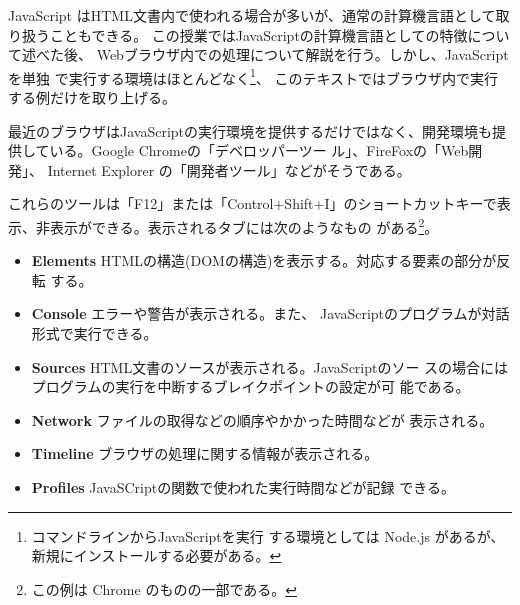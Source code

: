 JavaScript はHTML文書内で使われる場合が多いが、通常の計算機言語として取
り扱うこともできる。
この授業ではJavaScriptの計算機言語としての特徴について述べた後、
Webブラウザ内での処理について解説を行う。しかし、JavaScriptを単独
で実行する環境はほとんどなく\footnote{コマンドラインからJavaScriptを実行
する環境としては Node.js があるが、新規にインストールする必要がある。}、
このテキストではブラウザ内で実行する例だけを取り上げる。

最近のブラウザはJavaScriptの実行環境を提供するだけではなく、開発環境も提
供している。Google Chromeの「デベロッパーツー
ル」、FireFoxの「Web開発」、%
Internet Explorer の「開発者ツール」などがそうである。

これらのツールは「F12」または「Control+Shift+I」のショートカットキーで表
示、非表示ができる。表示されるタブには次のようなもの
がある\footnote{この例は Chrome のものの一部である。}。
\begin{itemize}
 \item {\bfseries Elements }
       HTMLの構造(DOMの構造)を表示する。対応する要素の部分が反転
       する。
 \item {\bfseries Console }エラーや警告が表示される。また、
       JavaScriptのプログラムが対話形式で実行できる。
 \item {\bfseries Sources }HTML文書のソースが表示される。JavaScriptのソー
       スの場合にはプログラムの実行を中断するブレイクポイントの設定が可
       能である。
 \item {\bfseries Network }ファイルの取得などの順序やかかった時間などが
       表示される。
 \item {\bfseries Timeline }ブラウザの処理に関する情報が表示される。
 \item {\bfseries Profiles }JavaSCriptの関数で使われた実行時間などが記録
       できる。
\end{itemize}